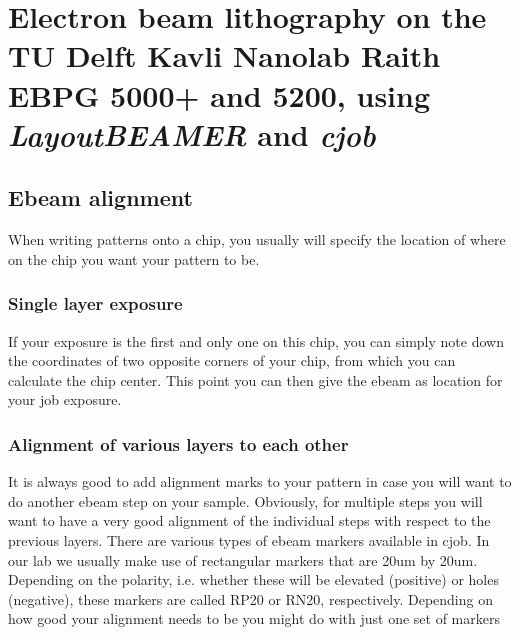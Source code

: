 \chapter{Electron beam lithography on the TU Delft Kavli Nanolab Raith EBPG 5000+ and 5200, using \textit{LayoutBEAMER} and \textit{cjob}}
\label{app:ebeam}
\clearpage

\section{Ebeam alignment}
When writing patterns onto a chip, you usually will specify the location of where on the chip you want your pattern to be.

\subsection{Single layer exposure}
If your exposure is the first and only one on this chip, you can simply note down the coordinates of two opposite corners of your chip, from which you can calculate the chip center. This point you can then give the ebeam as location for your job exposure.

\subsection{Alignment of various layers to each other}
It is always good to add alignment marks to your pattern in case you will want to do another ebeam step on your sample. Obviously, for multiple steps you will want to have a very good alignment of the individual steps with respect to the previous layers. There are various types of ebeam markers available in cjob. In our lab we usually make use of rectangular markers that are 20um by 20um. Depending on the polarity, i.e. whether these will be elevated (positive) or holes (negative), these markers are called RP20 or RN20, respectively.
Depending on how good your alignment needs to be you might do with just one set of markers

